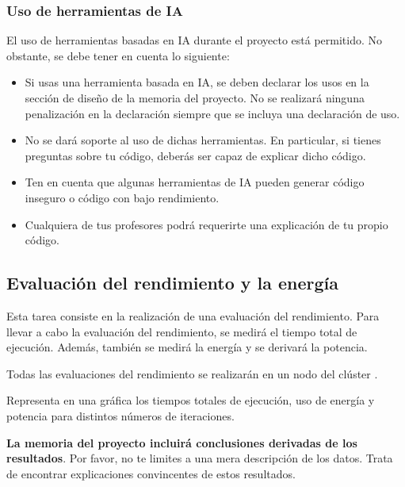 

\subsubsection{Uso de herramientas de IA}

El uso de herramientas basadas en IA durante el proyecto está permitido.
No obstante, se debe tener en cuenta lo siguiente:

\begin{itemize}

\item Si usas una herramienta basada en IA, se deben declarar los usos en 
la sección de diseño de la memoria del proyecto. No se realizará ninguna
penalización en la declaración siempre que se incluya una declaración de uso.

\item No se dará soporte al uso de dichas herramientas. En particular,
si tienes preguntas sobre tu código, deberás ser capaz de explicar dicho
código.

\item Ten en cuenta que algunas herramientas de IA pueden generar código
inseguro o código con bajo rendimiento.

\item Cualquiera de tus profesores podrá requerirte una explicación de tu propio 
código.

\end{itemize}

\subsection{Evaluación del rendimiento y la energía}

Esta tarea consiste en la realización de una evaluación del rendimiento.
Para llevar a cabo la evaluación del rendimiento, se medirá el tiempo total
de ejecución. Además, también se medirá la energía y se derivará la potencia.

Todas las evaluaciones del rendimiento se realizarán en un nodo del clúster
.

Representa en una gráfica los tiempos totales de ejecución, uso de energía y
potencia para distintos números de iteraciones.

\textbf{La memoria del proyecto incluirá conclusiones derivadas de los
resultados}.
Por favor, no te limites a una mera descripción de los datos.
Trata de encontrar explicaciones convincentes de estos resultados.

